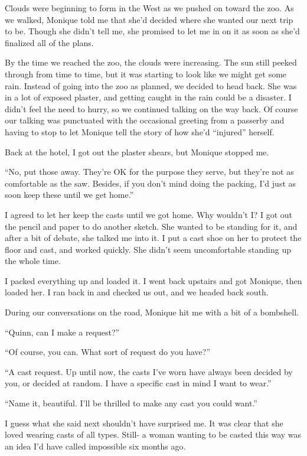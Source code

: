 Clouds were beginning to form in the West as we pushed on toward the zoo. As we walked,
Monique told me that she'd decided where she wanted our next trip to be. Though she didn't tell
me, she promised to let me in on it as soon as she'd finalized all of the plans.

By the time we reached the zoo, the clouds were increasing. The sun still peeked through
from time to time, but it was starting to look like we might get some rain. Instead of going
into the zoo as planned, we decided to head back. She was in a lot of exposed plaster, and
getting caught in the rain could be a disaster. I didn't feel the need to hurry, so we continued
talking on the way back. Of course our talking was punctuated with the occasional greeting from
a passerby and having to stop to let Monique tell the story of how she'd ``injured'' herself.

Back at the hotel, I got out the plaster shears, but Monique stopped me.

``No, put those away. They're OK for the purpose they serve, but they're not as comfortable
as the saw. Besides, if you don't mind doing the packing, I'd just as soon keep these until we
get home.''

I agreed to let her keep the casts until we got home. Why wouldn't I? I got out the pencil
and paper to do another sketch. She wanted to be standing for it, and after a bit of debate, she
talked me into it. I put a cast shoe on her to protect the floor and cast, and worked quickly.
She didn't seem uncomfortable standing up the whole time.

I packed everything up and loaded it. I went back upstairs and got Monique, then loaded
her. I ran back in and checked us out, and we headed back south.

During our conversations on the road, Monique hit me with a bit of a bombshell.

``Quinn, can I make a request?''

``Of course, you can. What sort of request do you have?''

``A cast request. Up until now, the casts I've worn have always been decided by you, or
decided at random. I have a specific cast in mind I want to wear.''

``Name it, beautiful. I'll be thrilled to make any cast you could want.''

I guess what she said next shouldn't have surprised me. It was clear that she loved wearing
casts of all types. Still- a woman wanting to be casted this way was an idea I'd have called
impossible six months ago.

